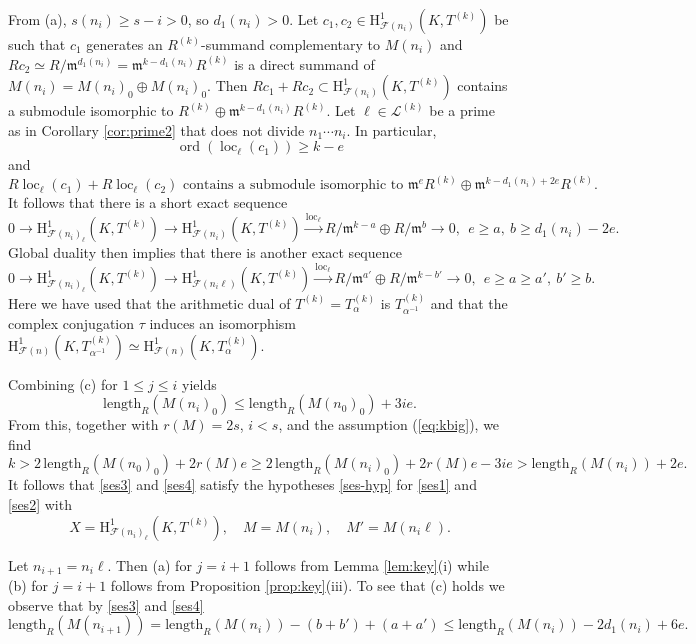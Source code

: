 \documentclass[10pt]{amsart}
\numberwithin{equation}{section}
\theoremstyle{definition}
\theoremstyle{remark}
\newcommand{\rH}{\mathrm{H}}
\newcommand{\fm}{\mathfrak{m}}
\DeclareMathOperator{\loc}{loc}
\DeclareMathOperator{\ord}{ord}
\newcommand{\CF}{\mathcal{F}}
\newcommand{\CL}{\mathscr{L}}
\begin{document}
From (a), $s(n_i) \geqslant s - i>0$, so $d_1(n_i)>0$. 
Let $c_1, c_2 \in \rH^1_{\CF(n_i)}(K,T^{(k)})$ be such that $c_1$ generates an $R^{(k)}$-summand complementary
to $M(n_i)$  and
$R c_2 \simeq R/\fm^{d_1(n_i)} = \fm^{k-d_1(n_i)}R^{(k)}$ is a direct summand of 
$M(n_i) = M(n_i)_0\oplus M(n_i)_0$. Then $Rc_1+R c_2\subset \rH^1_{\CF(n_i)}(K,T^{(k)})$ contains a submodule
isomorphic to $R^{(k)}\oplus \fm^{k-d_1(n_i)}R^{(k)}$. 
Let $\ell \in \CL^{(k)}$ be a prime as in Corollary \ref{cor:prime2} that does not divide $n_1\cdots n_i$. 
In particular,
$$
\ord(\loc_\ell(c_1)) \geqslant k-e
$$
and
$$
\text{$R\loc_\ell(c_1) + R\loc_\ell(c_2)$ contains a submodule isomorphic to 
$\fm^{e}R^{(k)}\oplus \fm^{k-d_1(n_i)+2e}R^{(k)}$.}
$$
It follows that there is a short exact sequence
\begin{equation}\label{ses3}
0 \rightarrow \rH^1_{\CF(n_i)_\ell}(K,T^{(k)}) \rightarrow \rH^1_{\CF(n_i)}(K,T^{(k)}) \xrightarrow{\loc_\ell} R/\fm^{k-a} \oplus R/\fm^{b}
\rightarrow 0, \ \ e \geqslant a, \ b\geqslant d_1(n_i)-2e.
\end{equation}
Global duality then implies that there is another exact sequence
\begin{equation}\label{ses4}
0 \rightarrow \rH^1_{\CF(n_i)_\ell}(K,T^{(k)}) \rightarrow \rH^1_{\CF(n_i\ell)}(K,T^{(k)}) \xrightarrow{\loc_\ell} R/\fm^{a'} \oplus R/\fm^{k-b'}
\rightarrow 0, \ \ e\geqslant a\geqslant a', \ b'\geqslant b.
\end{equation}
Here we have used that the arithmetic dual of $T^{(k)} = T^{(k)}_\alpha$ is $T^{(k)}_{\alpha^{-1}}$ and that the complex conjugation $\tau$ induces an isomorphism $\rH^1_{\CF(n)}(K,T^{(k)}_{\alpha^{-1}})\simeq \rH^1_{\CF(n)}(K,T^{(k)}_{\alpha})$.

Combining (c) for $1\leqslant j \leqslant i$ yields 
$$
\mathrm{length}_R(M(n_{i})_0) \leqslant \mathrm{length}_R(M(n_0)_0) + 3i e.
$$
From this, together with $r(M)=2s$, $i< s$, and the assumption (\ref{eq:kbig}), we find
$$
k> 2\,\mathrm{length}_R(M(n_0)_0) + 2r(M)e \geqslant 2\,\mathrm{length}_R(M(n_i)_0)+2r(M)e-3ie  
> \mathrm{length}_R(M(n_i))+2e.
$$
It follows that \eqref{ses3} and \eqref{ses4} satisfy the hypotheses \eqref{ses-hyp} for \eqref{ses1} and \eqref{ses2}
with 
\[
X =  \rH^1_{\CF(n_i)_\ell}(K,T^{(k)}),
\quad 
M = M(n_i),\quad M' = M(n_i\ell).
\]

Let $n_{i+1}=n_i\ell$.  Then (a) for $j={i+1}$ follows from Lemma \ref{lem:key}(i)
while (b) for $j=i+1$ follows from Proposition \ref{prop:key}(iii).
To see that (c) holds we observe that by \eqref{ses3} and \eqref{ses4}
$$
\mathrm{length}_R(M(n_{i+1})) = \mathrm{length}_R(M(n_{i})) - (b+b') + (a+a') 
\leqslant \mathrm{length}_R(M(n_{i})) - 2d_1(n_{i}) + 6e.
$$
\end{document}
